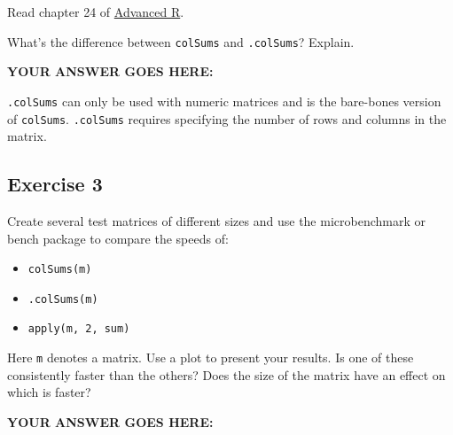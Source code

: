 \documentclass[
]{article}
\providecommand{\tightlist}{%
  \setlength{\itemsep}{0pt}\setlength{\parskip}{0pt}}
\begin{document}
Read chapter 24 of \href{https://adv-r.hadley.nz}{Advanced R}.

What's the difference between \texttt{colSums} and \texttt{.colSums}?
Explain.

\textbf{YOUR ANSWER GOES HERE:}

\texttt{.colSums} can only be used with numeric matrices and is the
bare-bones version of \texttt{colSums}. \texttt{.colSums} requires
specifying the number of rows and columns in the matrix.

\hypertarget{exercise-3}{%
\subsection{Exercise 3}\label{exercise-3}}

Create several test matrices of different sizes and use the
microbenchmark or bench package to compare the speeds of:

\begin{itemize}
\tightlist
\item
  \texttt{colSums(m)}
\item
  \texttt{.colSums(m)}
\item
  \texttt{apply(m,\ 2,\ sum)}
\end{itemize}

Here \texttt{m} denotes a matrix. Use a plot to present your results. Is
one of these consistently faster than the others? Does the size of the
matrix have an effect on which is faster?

\textbf{YOUR ANSWER GOES HERE:}
\end{document}
